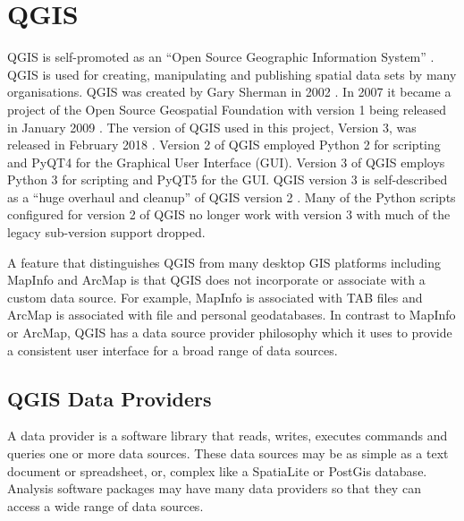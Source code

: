 \documentclass[a4paper,11pt,english]{sphinxmanual}
\begin{document}
\section{QGIS}
\label{\detokenize{background:qgis}}
QGIS is self-promoted as an “Open Source Geographic Information System” .  QGIS is used for creating, manipulating and publishing spatial data sets by many organisations. QGIS was created by Gary Sherman in 2002 .  In 2007 it became a project of the Open Source Geospatial Foundation with version 1 being released in January 2009 .  The version of QGIS used in this project, Version 3, was released in February 2018 .  Version 2 of QGIS employed Python 2 for scripting and PyQT4 for the Graphical User Interface (GUI).  Version 3 of QGIS employs Python 3 for scripting and PyQT5 for the GUI.  QGIS version 3 is self-described as a “huge overhaul and cleanup” of QGIS version 2 .  Many of the Python scripts configured for version 2 of QGIS no longer work with version 3 with much of the legacy sub-version support dropped.

A feature that distinguishes QGIS from many desktop GIS platforms including MapInfo and ArcMap is that QGIS does not incorporate or associate with a custom data source.  For example, MapInfo is associated with TAB files and ArcMap is associated with file and personal geodatabases.  In contrast to MapInfo or ArcMap, QGIS has a data source provider philosophy which it uses to provide a consistent user interface for a broad range of data sources.


\subsection{QGIS Data Providers}
\label{\detokenize{background:qgis-data-providers}}
A data provider is a software library that reads, writes, executes commands and queries one or more data sources.  These data sources may be as simple as a text document or spreadsheet, or, complex like a SpatiaLite or PostGis database.  Analysis software packages may have many data providers so that they can access a wide range of data sources.
\end{document}
